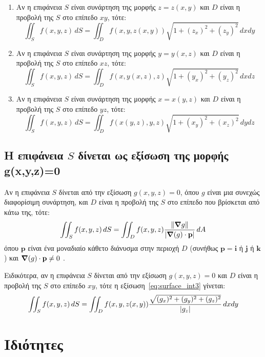 \begin{enumerate}
  \item Αν η επιφάνεια $S$ είναι συνάρτηση της μορφής $ z=z(x,y) $ και $D$ είναι η 
    προβολή της $S$ στο επίπεδο $ xy $, τότε: 
    \[
      \iint_{S} f(x,y,z) \,{dS} = \iint_{D} f(x,y,z(x,y)) \sqrt{1+(z_{x})^{2}+
      (z_{y})^{2}} \,{dx}{dy} 
    \] 

  \item Αν η επιφάνεια $S$ είναι συνάρτηση της μορφής $ y=y(x,z) $ και $D$ είναι η 
    προβολή της $S$ στο επίπεδο $ xz $, τότε: 
    \[
      \iint_{S} f(x,y,z) \,{dS} = \iint_{D} f(x,y(x,z),z) \sqrt{1+(y_{x})^{2}+
      (y_{z})^{2}} \,{dx}{dz} 
    \] 
  \item Αν η επιφάνεια $S$ είναι συνάρτηση της μορφής $ x=x(y,z) $ και $D$ είναι η 
    προβολή της $S$ στο επίπεδο $ yz $, τότε: 
    \[
      \iint_{S} f(x,y,z) \,{dS} = \iint_{D} f(x(y,z),y,z) \sqrt{1+(x_{y})^{2}+
      (x_{z})^{2}} \,{dy}{dz} 
    \] 
\end{enumerate}

\subsection*{Η επιφάνεια $S$ δίνεται ως εξίσωση της μορφής g(x,y,z)=0}
Αν η επιφάνεια $S$ δίνεται από την εξίσωση $ g(x,y,z) = 0 $, όπου $ g $ είναι μια 
συνεχώς διαφορίσιμη συνάρτηση, και $D$ είναι η προβολή της $S$ στο επίπεδο που βρίσκεται 
από κάτω της, τότε:
\begin{equation}\label{eq:surface_int3}
  \iint_{S} f(x,y,z) \,{dS} = \iint_{D} f(x,y,z)
  \frac{\norm{\grad{g}}}{\abs{\grad(g) \cdot \mathbf{p}}} \,{dA} 
\end{equation}
όπου $ \mathbf{p} $ είναι ένα μοναδιαίο κάθετο διάνυσμα στην περιοχή $D$ (συνήθως 
$ \mathbf{p} = \mathbf{i} $ ή $ \mathbf{j} $ ή $ \mathbf{k} $) και 
$ \grad(g)\cdot \mathbf{p} \neq 0 $ .  

Ειδικότερα, αν η επιφάνεια $S$ δίνεται από την εξίσωση $ g(x,y,z) = 0 $ και $D$ είναι η
προβολή της $S$ στο επίπεδο $ xy $, τότε η εξίσωση~\eqref{eq:surface_int3} γίνεται:
\[
  \iint_{S} f(x,y,z) \,{dS} = \iint_{D} f(x,y,z(x,y)) \frac{\sqrt{(g_{x})^{2}+
  (g_{y})^{2}+(g_{z})^{2}}}{\abs{g_{z}}} \,{dx}{dy} 
\]


\section{Ιδιότητες}

